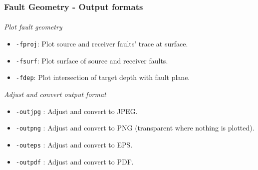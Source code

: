 \begin{frame}
  \frametitle{Fault Geometry - Output formats}
  \framesubtitle{}
  \label{ch4fr:faultopt}

\emph{Plot fault geometry}

\begin{scriptsize}
\begin{itemize}
\item
  \texttt{-fproj}: Plot source and receiver faults' trace at surface.
\item
  \texttt{-fsurf}: Plot surface of source and receiver faults.
\item
  \texttt{-fdep}: Plot intersection of target depth with fault plane.
\end{itemize}
\end{scriptsize}

\emph{Adjust and convert output format}
\begin{scriptsize}
\begin{itemize}
\item
  \texttt{-outjpg} : Adjust and convert to JPEG.
\item
  \texttt{-outpng} : Adjust and convert to PNG (transparent where
  nothing is plotted).
\item
  \texttt{-outeps} : Adjust and convert to EPS.
\item
  \texttt{-outpdf} : Adjust and convert to PDF.
\end{itemize}
\end{scriptsize}
\end{frame}
\note{}

